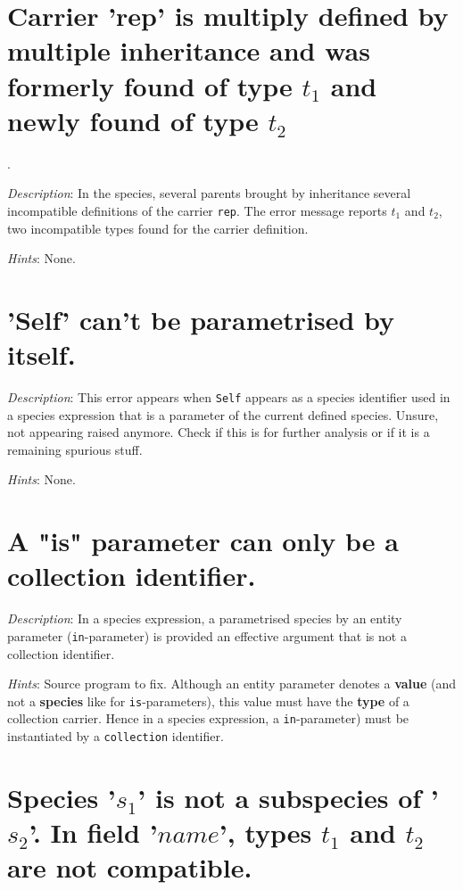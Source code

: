 \section*{Carrier 'rep' is multiply defined by multiple inheritance and
  was formerly found of type $t_1$ and newly found of type $t_2$}.

{\em Description}: In the species, several parents brought by
inheritance several incompatible definitions of the carrier
{\tt rep}. The error message reports $t_1$ and $t_2$, two incompatible
types found for the carrier definition.

{\em Hints}: None.



\section*{'Self' can't be parametrised by itself.}

{\em Description}: This error appears when {\tt Self} appears as a
species identifier used in a species expression that is a parameter of
the current defined species.
{\color{red} Unsure, not appearing raised anymore. Check if this is
  for further analysis or if it is a remaining spurious stuff.}

{\em Hints}: None.



\section*{A "is" parameter can only be a collection identifier.}

{\em Description}: In a species expression, a parametrised species by
an entity parameter ({\tt in}-parameter) is provided an effective
argument that is not a collection identifier.

{\em Hints}: Source program to fix. Although an entity parameter
denotes a {\bf value} (and not a {\bf species} like for
{\tt is}-parameters), this value must have the {\bf type} of a
collection carrier. Hence in a species expression, a
{\tt in}-parameter) must be instantiated by a {\tt collection}
identifier.


\section*{Species '$s_1$' is not a subspecies of '$s_2$'. In field
  '$name$', types $t_1$ and $t_2$ are not compatible.}


